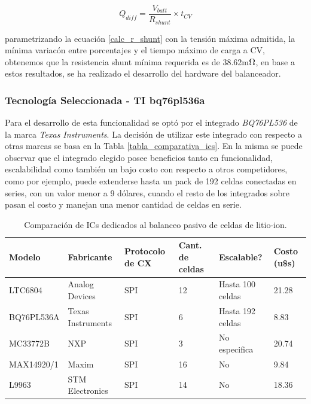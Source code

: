 \documentclass[10pt, a4paper]{article}
\begin{document}
\begin{equation}
    Q_{diff} = \frac{V_{batt}}{R_{shunt}} \times t_{CV} \label{calc_r_shunt}
\end{equation}

parametrizando la ecuaci\'on \ref{calc_r_shunt} con la tensi\'on m\'axima
admitida, la m\'inima variac\'on entre porcentajes y el tiempo m\'aximo de carga
a \acrshort{CV}, obtenemos que la resistencia shunt m\'inima requerida es de 
38.62m$\mathrm{\ohm}$, en base a estos resultados, se ha realizado el desarrollo
del hardware del balanceador.

\subsubsection{Tecnolog\'ia Seleccionada - TI
bq76pl536a}\label{seq:bq26_selection}

Para el desarrollo de esta funcionalidad se opt\'o por el integrado
\emph{BQ76PL536} de la marca \emph{Texas Instruments}. La decisi\'on de utilizar
este integrado con respecto a otras marcas se basa en la Tabla 
\ref{tabla_comparativa_ics}. En la misma se puede observar que el integrado
elegido posee beneficios tanto en funcionalidad, escalabilidad como tambi\'en un
bajo costo con respecto a otros competidores, como por ejemplo, puede extenderse
hasta un pack de 192 celdas conectadas en series, con un valor menor a 9
d\'olares, cuando el resto de los integrados sobre pasan el costo y manejan una
menor cantidad de celdas en serie.

\begin{table}[h!]
    \begin{center}
        \begin{tabular}{llllll}
        \hline
        Modelo     & Fabricante        & Protocolo de CX    & Cant. de celdas & Escalable?          & Costo (u\$s) \\ \hline
        LTC6804    & Analog Devices    & SPI                & 12              & Hasta 100 celdas    & 21.28        \\
        BQ76PL536A & Texas Instruments & SPI                & 6               & Hasta 192 celdas    & 8.83         \\
        MC33772B   & NXP               & SPI                & 3               & No especifica       & 20.74        \\
        MAX14920/1 & Maxim             & SPI                & 16              & No                  & 9.84         \\
        L9963      & STM Electronics   & SPI                & 14              & No                  & 18.36        \\        
        \hline
        \end{tabular}
    \end{center}
    \caption{Comparaci\'on de \acrshort{IC}s dedicados al balanceo pasivo de
    celdas de litio-ion.}
\end{table}
\end{document}

